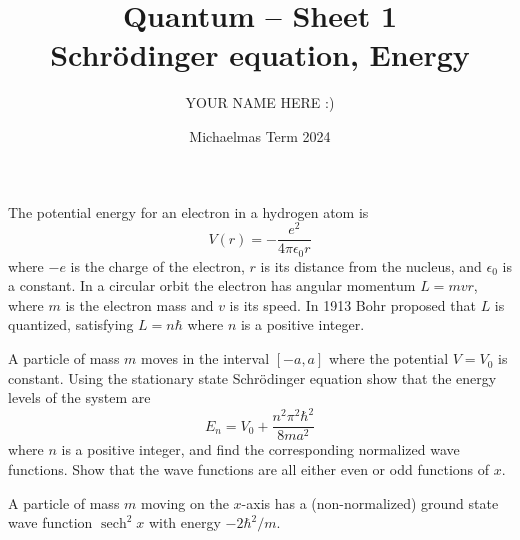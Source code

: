 \documentclass[answers]{exam}
\title{Quantum -- Sheet 1\\Schrödinger equation, Energy}
\author{YOUR NAME HERE :)}
\date{Michaelmas Term 2024}
\def\sech{\operatorname{sech}}
\begin{document}
\maketitle

\begin{questions}

\question%
The potential energy for an electron in a hydrogen atom is \[
	V(r)=-\frac{e^{2}}{4 \pi \epsilon_{0} r}
\] where $-e$ is the charge of the electron, $r$ is its distance from the nucleus, and $\epsilon_{0}$ is a constant. In a circular orbit the electron has angular momentum $L=m v r$, where $m$ is the electron mass and $v$ is its speed. In 1913 Bohr proposed that $L$ is quantized, satisfying $L=n \hbar$ where $n$ is a positive integer.



\question%
A particle of mass $m$ moves in the interval $[-a, a]$ where the potential $V=V_{0}$ is constant. Using the stationary state Schrödinger equation show that the energy levels of the system are \[
	E_{n}=V_{0}+\frac{n^{2} \pi^{2} \hbar^{2}}{8 m a^{2}}
\] where $n$ is a positive integer, and find the corresponding normalized wave functions. Show that the wave functions are all either even or odd functions of $x$.



\question%
A particle of mass $m$ moving on the $x$-axis has a (non-normalized) ground state wave function $\sech^2 x$ with energy $-2 \hbar^{2} / m$.
\end{questions}
\end{document}
